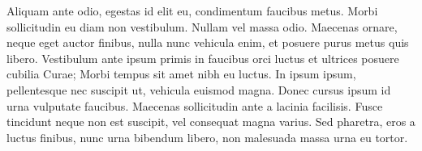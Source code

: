 Aliquam ante odio, egestas id elit eu, condimentum faucibus metus. Morbi sollicitudin eu diam non vestibulum. Nullam vel massa odio. Maecenas ornare, neque eget auctor finibus, nulla nunc vehicula enim, et posuere purus metus quis libero. Vestibulum ante ipsum primis in faucibus orci luctus et ultrices posuere cubilia Curae; Morbi tempus sit amet nibh eu luctus. In ipsum ipsum, pellentesque nec suscipit ut, vehicula euismod magna. Donec cursus ipsum id urna vulputate faucibus. Maecenas sollicitudin ante a lacinia facilisis. Fusce tincidunt neque non est suscipit, vel consequat magna varius. Sed pharetra, eros a luctus finibus, nunc urna bibendum libero, non malesuada massa urna eu tortor.